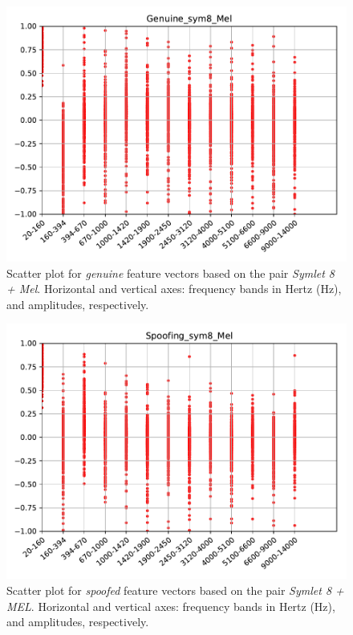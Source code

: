 		\begin{figure}[H]
			\centering
			\includegraphics[scale=.7]{images/results/barkVersusMel/Genuine_sym8_Mel.pdf}
			\caption{Scatter plot for \textit{genuine} feature vectors based on the pair \textit{Symlet 8 + Mel}. Horizontal and vertical axes: frequency bands in Hertz (Hz), and amplitudes, respectively.}
			\label{fig:livesym8mel}
		\end{figure}
		\begin{figure}[H]
			\centering
			\includegraphics[scale=.7]{images/results/barkVersusMel/Spoofing_sym8_Mel.pdf}
			\caption{Scatter plot for \textit{spoofed} feature vectors based on the pair \textit{Symlet 8 + MEL}. Horizontal and vertical axes: frequency bands in Hertz (Hz), and amplitudes, respectively.}
			\label{fig:spoofingsym8mel}
		\end{figure}